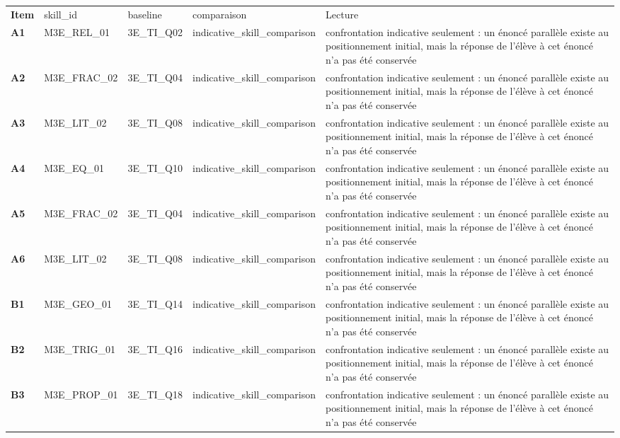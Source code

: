 \documentclass[10pt,a4paper]{article}
\begin{document}
\par\noindent\begin{tabularx}{\linewidth}{>{\bfseries}p{9mm} >{\ttfamily\scriptsize}p{25mm} >{\ttfamily\scriptsize}p{22mm} >{\ttfamily\scriptsize}p{16mm} X}
\rowcolor{Navy}\color{white}Item & \color{white}\scriptsize skill\_id & \color{white}\scriptsize baseline & \color{white}\scriptsize comparaison & \color{white}Lecture \\
A1 & M3E\_REL\_01 & 3E\_TI\_Q02 & indicative\_skill\_comparison & confrontation indicative seulement : un énoncé parallèle existe au positionnement initial, mais la réponse de l'élève à cet énoncé n'a pas été conservée \\
A2 & M3E\_FRAC\_02 & 3E\_TI\_Q04 & indicative\_skill\_comparison & confrontation indicative seulement : un énoncé parallèle existe au positionnement initial, mais la réponse de l'élève à cet énoncé n'a pas été conservée \\
A3 & M3E\_LIT\_02 & 3E\_TI\_Q08 & indicative\_skill\_comparison & confrontation indicative seulement : un énoncé parallèle existe au positionnement initial, mais la réponse de l'élève à cet énoncé n'a pas été conservée \\
A4 & M3E\_EQ\_01 & 3E\_TI\_Q10 & indicative\_skill\_comparison & confrontation indicative seulement : un énoncé parallèle existe au positionnement initial, mais la réponse de l'élève à cet énoncé n'a pas été conservée \\
A5 & M3E\_FRAC\_02 & 3E\_TI\_Q04 & indicative\_skill\_comparison & confrontation indicative seulement : un énoncé parallèle existe au positionnement initial, mais la réponse de l'élève à cet énoncé n'a pas été conservée \\
A6 & M3E\_LIT\_02 & 3E\_TI\_Q08 & indicative\_skill\_comparison & confrontation indicative seulement : un énoncé parallèle existe au positionnement initial, mais la réponse de l'élève à cet énoncé n'a pas été conservée \\
B1 & M3E\_GEO\_01 & 3E\_TI\_Q14 & indicative\_skill\_comparison & confrontation indicative seulement : un énoncé parallèle existe au positionnement initial, mais la réponse de l'élève à cet énoncé n'a pas été conservée \\
B2 & M3E\_TRIG\_01 & 3E\_TI\_Q16 & indicative\_skill\_comparison & confrontation indicative seulement : un énoncé parallèle existe au positionnement initial, mais la réponse de l'élève à cet énoncé n'a pas été conservée \\
B3 & M3E\_PROP\_01 & 3E\_TI\_Q18 & indicative\_skill\_comparison & confrontation indicative seulement : un énoncé parallèle existe au positionnement initial, mais la réponse de l'élève à cet énoncé n'a pas été conservée \\

\end{tabularx}
\end{document}
